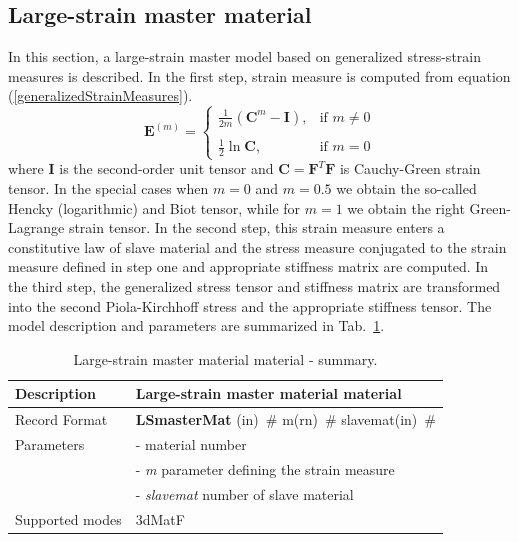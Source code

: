 \documentclass[a4paper]{article}
\newcommand{\descitem}[1]{{\noindent \bf #1}}
\newcommand{\elemparam}[2]{{{#1\tiny (#2)}~\#}}
\newcommand{\param}[1]{{\it #1}}
\begin{document}
\subsection{Large-strain master material}
In this section, a large-strain master model based on generalized stress-strain measures is described. 
In the first step, strain measure is computed from equation (\ref{generalizedStrainMeasures}).
\begin{equation}\label{generalizedStrainMeasures}
\boldsymbol{E}^{(m)} = \begin{cases}
 \displaystyle{\frac{1}{2m}}\left(\boldsymbol{C}^m-\boldsymbol{I}\right), & \text{if }m \neq 0 \\
 \\
 \displaystyle{\frac{1}{2}}\ln\boldsymbol{C}, & \text{if }m = 0
\end{cases} 
\end{equation}
 where $\boldsymbol{I}$ is the second-order unit tensor and $\boldsymbol{C} = \boldsymbol{F}^T\boldsymbol{F}$ is Cauchy-Green strain tensor. In the special cases when $m = 0$ and $m = 0.5$ we obtain the so-called Hencky (logarithmic) and Biot tensor, while for $m = 1$ we obtain the right Green-Lagrange strain tensor.   
 In the second step, this strain measure enters a constitutive law of slave material and the stress measure conjugated to the strain measure defined in step one and appropriate stiffness matrix are computed. In the third step, the generalized stress tensor and stiffness matrix are transformed into the second Piola-Kirchhoff stress and the appropriate stiffness tensor. 
The model description and parameters are summarized in Tab.~\ref{LSmasterMat_table}.
\begin{table}[!htb]
\begin{center}
\begin{tabular}{|l|p{9cm}|}
\hline
Description & Large-strain master material material\\
\hline
Record Format & \descitem{LSmasterMat}  \elemparam{}{in}
\elemparam{m}{rn} \elemparam{slavemat}{in}\\
Parameters &- \param{} material number\\
&- \param{m} parameter defining the strain measure\\
&- \param{slavemat} number of slave material\\
Supported modes& 3dMatF\\
\hline
\end{tabular}
\caption{Large-strain master material material - summary.}
\label{LSmasterMat_table}
\end{center}
\end{table}
\end{document}
